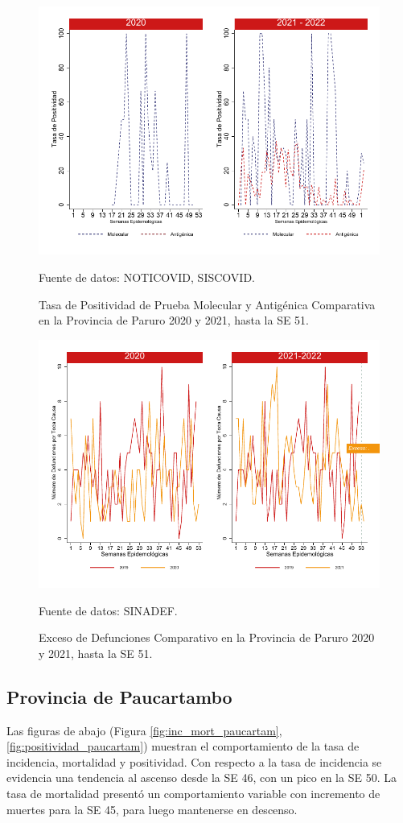 \documentclass[12pt,a4paper,openany]{book}
\begin{document}
		\begin{figure}[h]
			\caption{Tasa de Positividad de Prueba Molecular y Antigénica Comparativa en la Provincia de Paruro 2020 y 2021, hasta la SE 51.}\label{fig:positividad_paruro}
			\begin{center}
				\includegraphics[width=0.7\linewidth]{../figuras/positividad_20_21_10}
			\end{center}
			{\footnotesize {Fuente de datos: NOTICOVID, SISCOVID.}}
		\end{figure}
		
		\begin{figure}[h]
			\caption{Exceso de Defunciones Comparativo en la Provincia de Paruro 2020 y 2021, hasta la SE 51.}\label{fig:exceso_paruro}
			\begin{center}
				\includegraphics[width=0.7\linewidth]{../figuras/exceso_10}
			\end{center}
			{\footnotesize {Fuente de datos: SINADEF.}}
		\end{figure}
		
		
		\clearpage
		
		\subsection*{Provincia de Paucartambo}
		\noindent Las figuras de abajo (Figura \ref{fig:inc_mort_paucartam}, \ref{fig:positividad_paucartam}) muestran el comportamiento de la tasa de incidencia, mortalidad y positividad. Con respecto a la tasa de incidencia se evidencia una tendencia al ascenso desde la SE 46, con un pico en la SE 50.  
		La tasa de mortalidad presentó un comportamiento variable con incremento de muertes para la SE 45, para luego mantenerse en descenso.  
		
\end{document}
